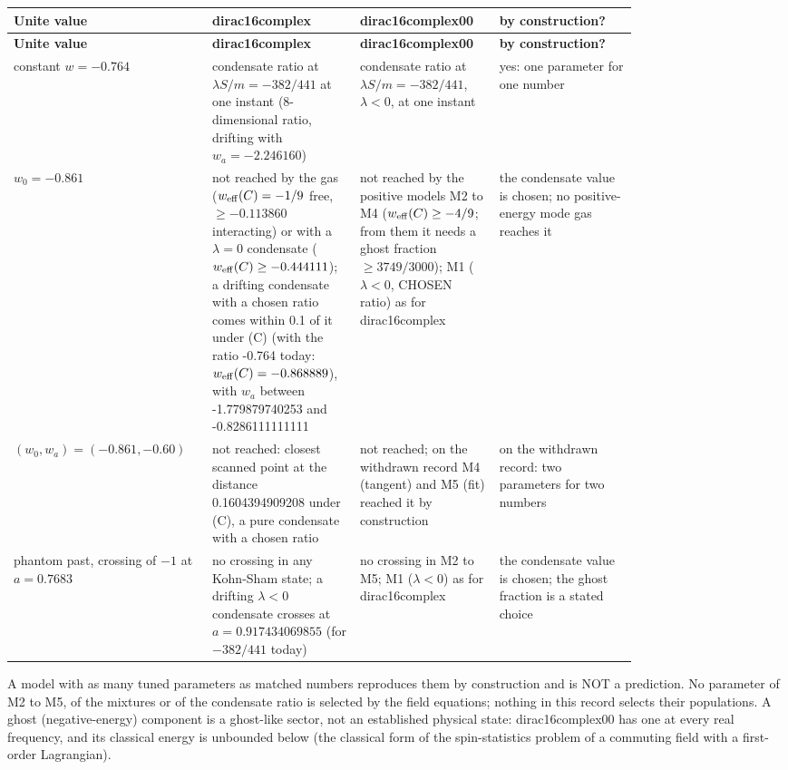 \documentclass[11pt]{article}
\begin{document}
\begingroup
\small
\begin{longtable}{@{}>{\raggedright\arraybackslash}p{0.200\linewidth}>{\raggedright\arraybackslash}p{0.200\linewidth}>{\raggedright\arraybackslash}p{0.200\linewidth}>{\raggedright\arraybackslash}p{0.200\linewidth}@{}}
\toprule
\textbf{Unite value} & \textbf{dirac16complex} & \textbf{dirac16complex00} & \textbf{by construction?} \\
\midrule
\endfirsthead
\toprule
\textbf{Unite value} & \textbf{dirac16complex} & \textbf{dirac16complex00} & \textbf{by construction?} \\
\midrule
\endhead
constant $w = -0.764$ & condensate ratio at $\lambda S/m = -382/441$ at one instant (8-dimensional ratio, drifting with $w_a = -2.246160$) & condensate ratio at $\lambda S/m = -382/441$, $\lambda < 0$, at one instant & yes: one parameter for one number \\
$w_0 = -0.861$ & not reached by the gas ($w_{\rm eff}(C) = -1/9$ free, $\geq -0.113860$ interacting) or with a $\lambda = 0$ condensate ($w_{\rm eff}(C) \geq -0.444111$); a drifting condensate with a chosen ratio comes within 0.1 of it under (C) (with the ratio -0.764 today: $w_{\rm eff}(C) = -0.868889$), with $w_a$ between -1.779879740253 and -0.8286111111111 & not reached by the positive models M2 to M4 ($w_{\rm eff}(C) \geq -4/9$; from them it needs a ghost fraction $\geq 3749/3000$); M1 ($\lambda < 0$, CHOSEN ratio) as for dirac16complex & the condensate value is chosen; no positive-energy mode gas reaches it \\
$(w_0, w_a) = (-0.861, -0.60)$ & not reached: closest scanned point at the distance 0.1604394909208 under (C), a pure condensate with a chosen ratio & not reached; on the withdrawn record M4 (tangent) and M5 (fit) reached it by construction & on the withdrawn record: two parameters for two numbers \\
phantom past, crossing of $-1$ at $a = 0.7683$ & no crossing in any Kohn-Sham state; a drifting $\lambda < 0$ condensate crosses at $a = 0.917434069855$ (for $-382/441$ today) & no crossing in M2 to M5; M1 ($\lambda < 0$) as for dirac16complex & the condensate value is chosen; the ghost fraction is a stated choice \\
\bottomrule
\end{longtable}
\endgroup

A model with as many tuned parameters as matched numbers reproduces them by construction and is NOT a prediction. No parameter of M2 to M5, of the mixtures or of the condensate ratio is selected by the field equations; nothing in this record selects their populations. A ghost (negative-energy) component is a ghost-like sector, not an established physical state: dirac16complex00 has one at every real frequency, and its classical energy is unbounded below (the classical form of the spin-statistics problem of a commuting field with a first-order Lagrangian).
\end{document}
